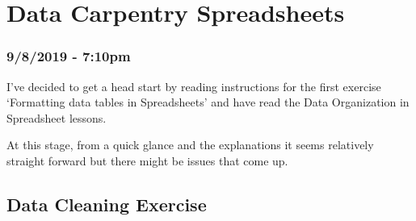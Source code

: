 \documentclass{article}
\begin{document}
\newpage
\section{Data Carpentry Spreadsheets}
\subsubsection*{9/8/2019 - 7:10pm}
I’ve decided to get a head start by reading instructions for the first exercise ‘Formatting data tables in Spreadsheets’ and have read the Data Organization in Spreadsheet lessons.\par
At this stage, from a quick glance and the explanations it seems relatively straight forward but there might be issues that come up.\par
\subsection{Data Cleaning Exercise}
\end{document}
